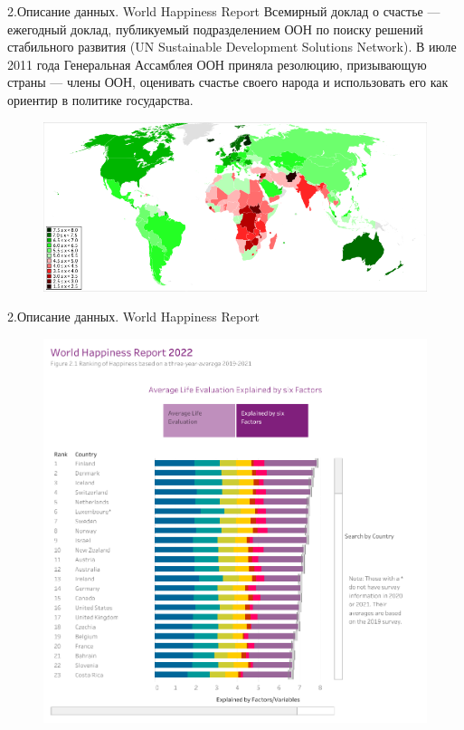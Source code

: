 \documentclass[aspectratio=169]{beamer}
\begin{document}
\begin{frame}{2.Описание данных. World Happiness Report}
Всемирный доклад о счастье  — ежегодный доклад, публикуемый подразделением ООН по поиску решений стабильного развития (UN Sustainable Development Solutions Network). В июле 2011 года Генеральная Ассамблея ООН приняла резолюцию, призывающую страны — члены ООН, оценивать счастье своего народа и использовать его как ориентир в политике государства. 

\begin{figure} \label{hompic}
            \centering
            \includegraphics[scale=0.4]{Union5.png}
    \end{figure}

\end{frame}

\begin{frame}{2.Описание данных. World Happiness Report}
 

\begin{figure} \label{hompic}
            \centering
            \includegraphics[scale=0.35]{FigureHappy1.png}
    \end{figure}

\end{frame}
\end{document}
